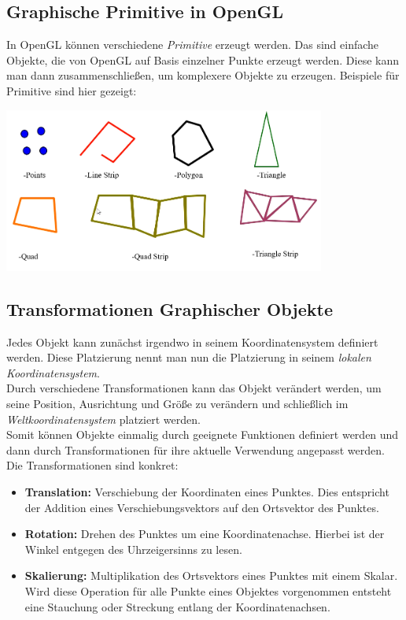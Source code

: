 \subsection{Graphische Primitive in OpenGL}
In OpenGL können verschiedene \textit{Primitive} erzeugt werden. Das sind einfache Objekte, die von OpenGL auf Basis einzelner Punkte erzeugt werden. Diese kann man dann zusammenschließen, um komplexere Objekte zu erzeugen. Beispiele für Primitive sind hier gezeigt:

\includegraphics[width=400px]{images/openGlPrimitives.png}

\subsection{Transformationen Graphischer Objekte}
Jedes Objekt kann zunächst irgendwo in seinem Koordinatensystem definiert werden. Diese Platzierung nennt man nun die Platzierung in seinem \textit{lokalen Koordinatensystem}.\\
Durch verschiedene Transformationen kann das Objekt verändert werden, um seine Position, Ausrichtung und Größe zu verändern und schließlich im \textit{Weltkoordinatensystem} platziert werden.\\
Somit können Objekte einmalig durch geeignete Funktionen definiert werden und dann durch Transformationen für ihre aktuelle Verwendung angepasst werden. Die Transformationen sind konkret:
\begin{itemize}
    \item \textbf{Translation:} Verschiebung der Koordinaten eines Punktes. Dies entspricht der Addition eines Verschiebungsvektors auf den Ortsvektor des Punktes.
    \item \textbf{Rotation:} Drehen des Punktes um eine Koordinatenachse. Hierbei ist der Winkel entgegen des Uhrzeigersinns zu lesen.
    \item \textbf{Skalierung:} Multiplikation des Ortsvektors eines Punktes mit einem Skalar. Wird diese Operation für alle Punkte eines Objektes vorgenommen entsteht eine Stauchung oder Streckung entlang der Koordinatenachsen.
\end{itemize}

